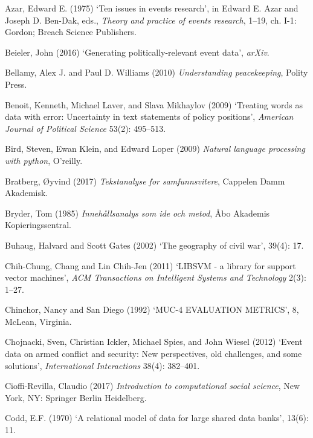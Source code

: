 \documentclass[12pt,twoside]{reedthesis}
\begin{document}
\hypertarget{ref-azar_ten_1975}{}
Azar, Edward E. (1975) `Ten issues in events research', in Edward E.
Azar and Joseph D. Ben-Dak, eds., \emph{Theory and practice of events
research}, 1--19, ch. I-1: Gordon; Breach Science Publishers.

\hypertarget{ref-beieler_generating_2016}{}
Beieler, John (2016) `Generating politically-relevant event data',
\emph{arXiv}.

\hypertarget{ref-bellamy_understanding_2010}{}
Bellamy, Alex J. and Paul D. Williams (2010) \emph{Understanding
peacekeeping}, Polity Press.

\hypertarget{ref-benoit_treating_2009}{}
Benoit, Kenneth, Michael Laver, and Slava Mikhaylov (2009) `Treating
words as data with error: Uncertainty in text statements of policy
positions', \emph{American Journal of Political Science} 53(2):
495--513.

\hypertarget{ref-bird_natural_2009}{}
Bird, Steven, Ewan Klein, and Edward Loper (2009) \emph{Natural language
processing with python}, O'reilly.

\hypertarget{ref-bratberg_tekstanalyse_2017}{}
Bratberg, Øyvind (2017) \emph{Tekstanalyse for samfunnsvitere}, Cappelen
Damm Akademisk.

\hypertarget{ref-bryder_innehallsanalys_1985}{}
Bryder, Tom (1985) \emph{Innehållsanalys som ide och metod}, Åbo
Akademis Kopieringssentral.

\hypertarget{ref-buhaug_geography_2002}{}
Buhaug, Halvard and Scott Gates (2002) `The geography of civil war',
39(4): 17.

\hypertarget{ref-chih-chung_libsvm_2011}{}
Chih-Chung, Chang and Lin Chih-Jen (2011) `LIBSVM - a library for
support vector machines', \emph{ACM Transactions on Intelligent Systems
and Technology} 2(3): 1--27.

\hypertarget{ref-chinchor_muc-4_1992}{}
Chinchor, Nancy and San Diego (1992) `MUC-4 EVALUATION METRICS', 8,
McLean, Virginia.

\hypertarget{ref-chojnacki_event_2012}{}
Chojnacki, Sven, Christian Ickler, Michael Spies, and John Wiesel (2012)
`Event data on armed conflict and security: New perspectives, old
challenges, and some solutions', \emph{International Interactions}
38(4): 382--401.

\hypertarget{ref-cioffi-revilla_introduction_2017}{}
Cioffi-Revilla, Claudio (2017) \emph{Introduction to computational
social science}, New York, NY: Springer Berlin Heidelberg.

\hypertarget{ref-codd_relational_1970}{}
Codd, E.F. (1970) `A relational model of data for large shared data
banks', 13(6): 11.
\end{document}
